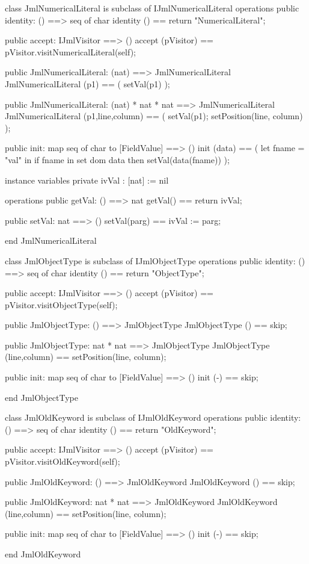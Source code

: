 \begin{vdm_al}
class JmlNumericalLiteral is subclass of IJmlNumericalLiteral
operations
  public identity: () ==> seq of char
  identity () == return "NumericalLiteral";

  public accept: IJmlVisitor ==> ()
  accept (pVisitor) == pVisitor.visitNumericalLiteral(self);

  public JmlNumericalLiteral:
    (nat) ==> JmlNumericalLiteral
  JmlNumericalLiteral (p1) == 
    ( setVal(p1) );

  public JmlNumericalLiteral:
    (nat) *
    nat *
    nat ==> JmlNumericalLiteral
  JmlNumericalLiteral (p1,line,column) == 
    ( setVal(p1);
      setPosition(line, column) );

  public init: map seq of char to [FieldValue] ==> ()
  init (data) ==
    ( let fname = "val" in
        if fname in set dom data
        then setVal(data(fname)) );

instance variables
  private ivVal : [nat] := nil

operations
  public getVal: () ==> nat
  getVal() == return ivVal;

  public setVal: nat ==> ()
  setVal(parg) == ivVal := parg;

end JmlNumericalLiteral
\end{vdm_al}

\begin{vdm_al}
class JmlObjectType is subclass of IJmlObjectType
operations
  public identity: () ==> seq of char
  identity () == return "ObjectType";

  public accept: IJmlVisitor ==> ()
  accept (pVisitor) == pVisitor.visitObjectType(self);

  public JmlObjectType:
    () ==> JmlObjectType
  JmlObjectType () == 
    skip;

  public JmlObjectType:
    nat *
    nat ==> JmlObjectType
  JmlObjectType (line,column) == 
    setPosition(line, column);

  public init: map seq of char to [FieldValue] ==> ()
  init (-) == skip;

end JmlObjectType
\end{vdm_al}

\begin{vdm_al}
class JmlOldKeyword is subclass of IJmlOldKeyword
operations
  public identity: () ==> seq of char
  identity () == return "OldKeyword";

  public accept: IJmlVisitor ==> ()
  accept (pVisitor) == pVisitor.visitOldKeyword(self);

  public JmlOldKeyword:
    () ==> JmlOldKeyword
  JmlOldKeyword () == 
    skip;

  public JmlOldKeyword:
    nat *
    nat ==> JmlOldKeyword
  JmlOldKeyword (line,column) == 
    setPosition(line, column);

  public init: map seq of char to [FieldValue] ==> ()
  init (-) == skip;

end JmlOldKeyword
\end{vdm_al}


